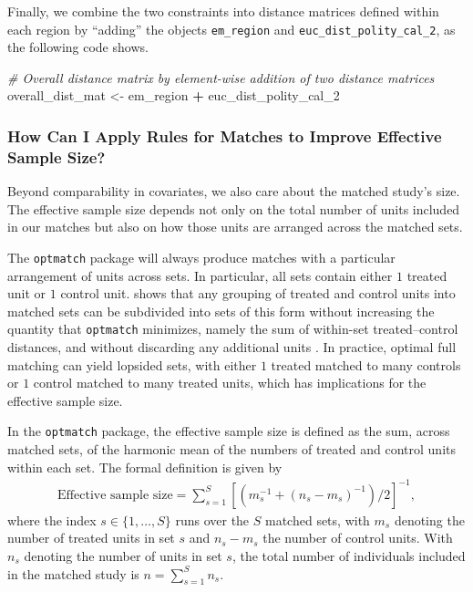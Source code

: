\documentclass[
  12pt,
  leqno]{article}
\newenvironment{Shaded}{\begin{snugshade}}{\end{snugshade}}
\newcommand{\CommentTok}[1]{\textcolor[rgb]{0.56,0.35,0.01}{\textit{#1}}}
\newcommand{\NormalTok}[1]{#1}
\newcommand{\OtherTok}[1]{\textcolor[rgb]{0.56,0.35,0.01}{#1}}
\newcommand{\SpecialCharTok}[1]{\textcolor[rgb]{0.81,0.36,0.00}{\textbf{#1}}}
\begin{document}
Finally, we combine the two constraints into distance matrices defined
within each region by ``adding'' the objects \texttt{em\_region} and
\texttt{euc\_dist\_polity\_cal\_2}, as the following code shows.

\singlespacing

\begin{Shaded}
\begin{Highlighting}[]
\CommentTok{\# Overall distance matrix by element{-}wise addition of two distance matrices}
\NormalTok{overall\_dist\_mat }\OtherTok{\textless{}{-}}\NormalTok{ em\_region }\SpecialCharTok{+}\NormalTok{ euc\_dist\_polity\_cal\_2}
\end{Highlighting}
\end{Shaded}

\doublespacing

\subsubsection{How Can I Apply Rules for Matches to Improve Effective
Sample
Size?}\label{how-can-i-apply-rules-for-matches-to-improve-effective-sample-size}

Beyond comparability in covariates, we also care about the matched
study's size. The effective sample size depends not only on the total
number of units included in our matches but also on how those units are
arranged across the matched sets.

The \texttt{optmatch} package will always produce matches with a
particular arrangement of units across sets. In particular, all sets
contain either \(1\) treated unit or \(1\) control unit.
\citet{rosenbaum1991} shows that any grouping of treated and control
units into matched sets can be subdivided into sets of this form without
increasing the quantity that \texttt{optmatch} minimizes, namely the sum
of within-set treated--control distances, and without discarding any
additional units \citep[see also][]{gurosenbaum1993, hansen2004}. In
practice, optimal full matching can yield lopsided sets, with either
\(1\) treated matched to many controls or \(1\) control matched to many
treated units, which has implications for the effective sample size.

In the \texttt{optmatch} package, the effective sample size is defined
as the sum, across matched sets, of the harmonic mean of the numbers of
treated and control units within each set. The formal definition is
given by \begin{align} \label{eq: harmonic mean}
\text{Effective sample size} = \sum \limits_{s = 1}^S \left[\left(m_s^{-1} + (n_s - m_s)^{-1}\right)/2\right]^{-1},
\end{align} where the index \(s \in \{1, \dots, S\}\) runs over the
\(S\) matched sets, with \(m_{s}\) denoting the number of treated units
in set \(s\) and \(n_s - m_s\) the number of control units. With \(n_s\)
denoting the number of units in set \(s\), the total number of
individuals included in the matched study is \(n = \sum_{s = 1}^S n_s\).
\end{document}
